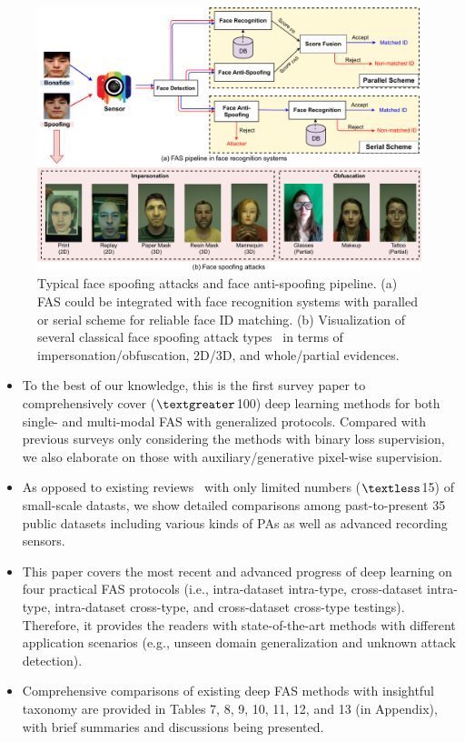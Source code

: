 \documentclass[10pt,journal,compsoc]{IEEEtran}
\begin{document}
\begin{figure}
\centering
\includegraphics[scale=0.4]{Figures/pipeline.pdf}
  \caption{ 
  Typical face spoofing attacks and face anti-spoofing pipeline. (a) FAS could be integrated with face recognition systems with paralled or serial scheme for reliable face ID matching. (b) Visualization of several classical face spoofing attack types~\cite{heusch2020deep} in terms of impersonation/obfuscation, 2D/3D, and whole/partial evidences.
  }
\label{fig:pipeline}
\end{figure}




\begin{itemize}
    
    \item To the best of our knowledge, this is the first survey paper to comprehensively cover ($\textgreater$100) deep learning methods for both single- and multi-modal FAS with generalized protocols. Compared with previous surveys only considering the methods with binary loss supervision, we also elaborate on those with auxiliary/generative pixel-wise supervision. 
    
    \item  As opposed to existing reviews~\cite{pereira2020rise,jia2020survey,el2020deep} with only limited numbers ($\textless$15) of small-scale datasts, we show detailed comparisons among past-to-present 35 public datasets including various kinds of PAs as well as advanced recording sensors.
    
   \item  This paper covers the most recent and advanced progress of deep learning on four practical FAS protocols (i.e., intra-dataset intra-type, cross-dataset intra-type, intra-dataset cross-type, and cross-dataset cross-type testings). Therefore, it provides the readers with state-of-the-art methods with different application scenarios (e.g., unseen domain generalization and unknown attack detection).
   
   \item  Comprehensive comparisons of existing deep FAS methods with insightful taxonomy are provided in Tables 7, 8, 9, 10, 11, 12, and 13 (in Appendix), with brief summaries and discussions being presented.
 
\end{itemize}
\end{document}
